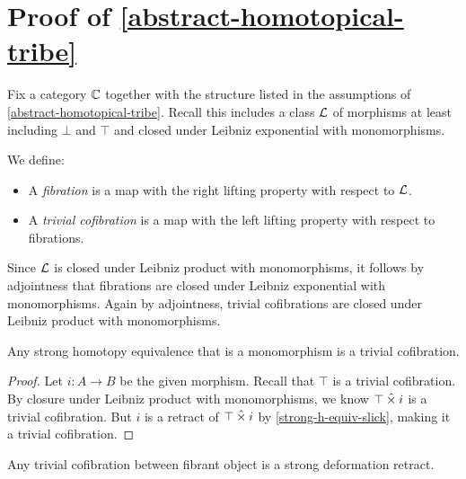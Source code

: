 \documentclass[reqno,10pt,a4paper,oneside]{amsart}
\begin{document}
\section{Proof of \cref{abstract-homotopical-tribe}}

Fix a category $\mathbb{C}$ together with the structure listed in the assumptions of \cref{abstract-homotopical-tribe}.
Recall this includes a class $\mathcal{L}$ of morphisms at least including $\bot$ and $\top$ and closed under Leibniz exponential with monomorphisms.

\begin{definition}
\label{def:fibration}
We define:
\begin{itemize}
\item
A \emph{fibration} is a map with the right lifting property with respect to $\mathcal{L}$.
\item
A \emph{trivial cofibration} is a map with the left lifting property with respect to fibrations.
\end{itemize}
\end{definition}

Since $\mathcal{L}$ is closed under Leibniz product with monomorphisms, it follows by adjointness that fibrations are closed under Leibniz exponential with monomorphisms.
Again by adjointness, trivial cofibrations are closed under Leibniz product with monomorphisms.

\begin{lemma}
\label{strong-h-equiv-mono-is-anodyne}
Any strong homotopy equivalence that is a monomorphism is a trivial cofibration.
\end{lemma}

\begin{proof}
Let $i : A \to B$ be the given morphism.
Recall that $\top$ is a trivial cofibration.
By closure under Leibniz product with monomorphisms, we know $\top \mathbin{\hat{\times}} i$ is a trivial cofibration.
But $i$ is a retract of $\top \mathbin{\hat{\times}} i$ by \cref{strong-h-equiv-slick}, making it a trivial cofibration.
\end{proof}

\begin{lemma}
\label{anodyne-between-fibrant-is-strong-def-retract}
Any trivial cofibration between fibrant object is a strong deformation retract.
\end{lemma}
\end{document}
